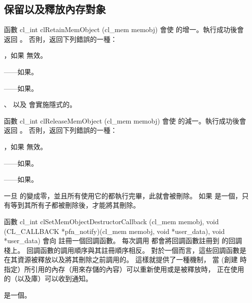 \subsection{保留以及釋放內存對象}

函數
\startclc
cl_int clRetainMemObject (cl_mem memobj)
\stopclc
會使  的增一。執行成功後會返回 。
否則，返回下列錯誤的一種：
\startigBase
\item {}，如果  無效。

\item {}——如果\scdevfailres。

\item {}——如果\schostfailres。
\stopigBase

、  以及  會實施隱式的。

函數
\startclc
cl_int clReleaseMemObject (cl_mem memobj)
\stopclc
會使  的減一。執行成功後會返回 。
否則，返回下列錯誤的一種：
\startigBase
\item {}，如果  無效。

\item {}——如果\scdevfailres。

\item {}——如果\schostfailres。
\stopigBase

一旦  的變成零，並且所有使用它的都執行完畢，此就會被刪除。
如果  是一個，只有等到其所有子都被刪除後，才能將其刪除。

函數
\startclc
cl_int clSetMemObjectDestructorCallback (cl_mem memobj,
		void (CL_CALLBACK *pfn_notify)(cl_mem memobj,
			void *user_data),
		void *user_data)
\stopclc
會向  註冊一個回調函數。
每次調用  都會將回調函數註冊到  的回調棧上。
回調函數的調用順序與其註冊順序相反。
對於一個而言，這些回調函數是在其資源被釋放以及將其刪除之前調用的。
這樣就提供了一種機制，
當  (創建  時指定）所引用的內存（用來存儲的內容）可以重新使用或是被釋放時，
正在使用  的（以及庫）可以收到通知。

 是一個。

